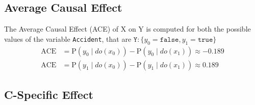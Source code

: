 \documentclass[a4paper,12pt]{article} %
\begin{document}
\subsection*{Average Causal Effect}
The Average Causal Effect (ACE) of X on Y is computed for both the possible values of the variable \texttt{Accident}, that are $\mathtt{Y}: \{ y_0=\mathtt{false}, y_1=\mathtt{true}\}$ 
\begin{equation}
\begin{aligned}
\text{ACE}&=\text{P}(y_0 \mid {do}(x_0)) -\text{P}(y_0 \mid {do}(x_1)) \approx -0.189
\\
\text{ACE}&=\text{P}(y_1 \mid {do}(x_0)) -\text{P}(y_1 \mid {do}(x_1)) \approx 0.189
\end{aligned}
\end{equation}


\subsection*{C-Specific Effect}
%
%
%
%
\end{document}
